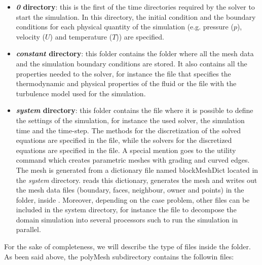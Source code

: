 \documentclass[a5paper]{sapthesis}
\begin{document}
	\begin{itemize}%
		\item 
		\textbf{\textit{0} directory}: this is the first of the time directories required by the solver to start the simulation. In this directory, the initial condition and the boundary conditions for each physical quantity of the simulation (e.g. pressure ($p$), velocity ($U$) and temperature ($T$)) are specified.
		\item
		\textbf{\textit{constant} directory}: this folder contains the  folder where all the mesh data and the simulation boundary conditions are stored. It also contains all the properties needed to the solver, for instance the  file that specifies the thermodynamic and physical properties of the fluid or the  file with the turbulence model used for the simulation.
		\item 
		\textbf{\textit{system} directory}: this folder contains the  file where it is possible to define the settings of the simulation, for instance the used solver, the simulation time and the time-step. The methods for the discretization of the solved equations are specified in the  file, while   the solvers for the discretized equations are specified in the  file. A special mention goes to the  utility command which creates parametric meshes with grading and curved edges. The mesh is generated from a dictionary file named blockMeshDict located in the \textit{system} directory.  reads this dictionary, generates the mesh and writes out the mesh data files (boundary, faces, neighbour, owner and points) in the  folder, inside . Moreover, depending on the case problem, other files can be included in the system directory, for instance the  file to decompose the domain simulation into several processors such to run the simulation in parallel.
	\end{itemize}
	
	\noindent For the sake of completeness, we will describe the type of files inside the  folder. As been said above, the polyMesh subdirectory contains the followin files:
	
\end{document}
